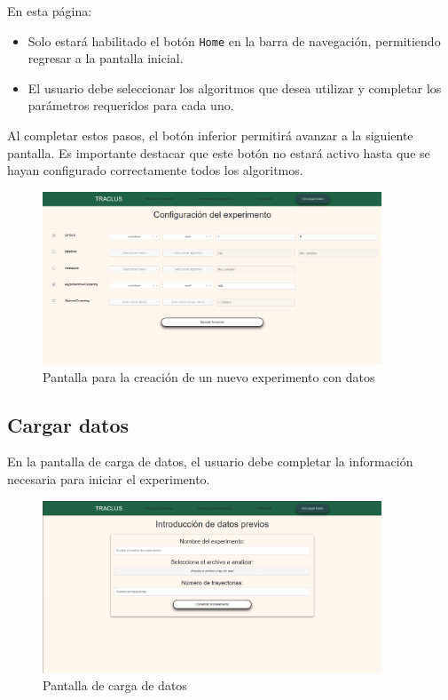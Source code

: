 En esta página:

\begin{itemize}
    \item Solo estará habilitado el botón \texttt{Home} en la barra de navegación, permitiendo regresar a la pantalla inicial.
    \item El usuario debe seleccionar los algoritmos que desea utilizar y completar los parámetros requeridos para cada uno.
\end{itemize}

Al completar estos pasos, el botón inferior permitirá avanzar a la siguiente pantalla. Es importante destacar que este botón no estará activo hasta que se hayan configurado correctamente todos los algoritmos.

\begin{figure}[H]
    \centering
    \includegraphics[width=0.9\textwidth]{img/webpage/experiment_page_complete.png}
    \caption{Pantalla para la creación de un nuevo experimento con datos}
\end{figure}

\subsection{Cargar datos}

En la pantalla de carga de datos, el usuario debe completar la información necesaria para iniciar el experimento.

\begin{figure}[H]
    \centering
    \includegraphics[width=0.9\textwidth]{img/webpage/load_page.png}
    \caption{Pantalla de carga de datos}
\end{figure}

